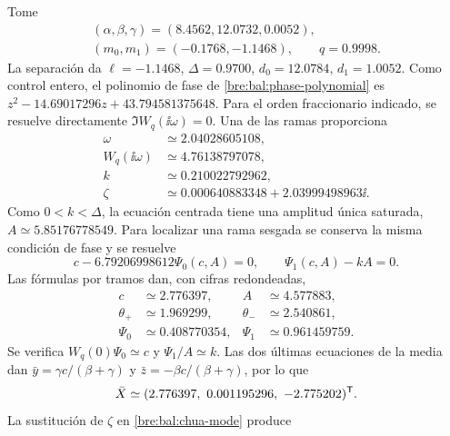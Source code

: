 Tome
\begin{equation}
 \begin{gathered}
 (\alpha,\beta,\gamma)=(8.4562,12.0732,0.0052),\\
 (m_0,m_1)=(-0.1768,-1.1468),\qquad q=0.9998.
 \end{gathered}
 \label{bre:bal:example-parameters}
\end{equation}
La separación da \(\ell=-1.1468\), \(\Delta=0.9700\),
\(d_0=12.0784\), \(d_1=1.0052\). Como control entero, el polinomio
de fase de \eqref{bre:bal:phase-polynomial} es
\(z^2-14.69017296z+43.794581375648\). Para el orden fraccionario
indicado, se resuelve directamente \(\Im W_q(\ii\omega)=0\).
Una de las ramas proporciona
\begin{equation}
 \begin{aligned}
 \omega&\simeq2.04028605108,\\
 W_q(\ii\omega)&\simeq4.76138797078,\\
 k&\simeq0.210022792962,\\
 \zeta&\simeq0.000640883348+2.03999498963\ii.
 \end{aligned}
 \label{bre:bal:example-frequency}
\end{equation}
Como \(0<k<\Delta\), la ecuación centrada tiene una amplitud única
saturada, \(A\simeq5.85176778549\). Para localizar una rama sesgada
se conserva la misma condición de fase y se resuelve
\begin{equation}
 c-6.79206998612\Psi_0(c,A)=0,\qquad
 \Psi_1(c,A)-kA=0.
 \label{bre:bal:example-system}
\end{equation}
Las fórmulas por tramos dan, con cifras redondeadas,
\begin{equation}
 \begin{aligned}
 c&\simeq2.776397,& A&\simeq4.577883,\\
 \theta_+&\simeq1.969299,&\theta_-&\simeq2.540861,\\
 \Psi_0&\simeq0.408770354,&\Psi_1&\simeq0.961459759.
 \end{aligned}
 \label{bre:bal:example-bias}
\end{equation}
Se verifica \(W_q(0)\Psi_0\simeq c\) y
\(\Psi_1/A\simeq k\). Las dos últimas ecuaciones de la media dan
\(\bar y=\gamma c/(\beta+\gamma)\) y
\(\bar z=-\beta c/(\beta+\gamma)\), por lo que
\begin{equation}
 \bar X\simeq(2.776397,\ 0.001195296,\ -2.775202)^{\T}.
 \label{bre:bal:example-mean}
\end{equation}
La sustitución de \(\zeta\) en \eqref{bre:bal:chua-mode} produce
